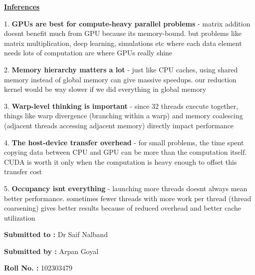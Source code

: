 \documentclass[12pt]{article}
\begin{document}
\vspace{1cm}

\textbf{\Large \underline{Inferences}}

\vspace{1cm}

1. \textbf{GPUs are best for compute-heavy parallel problems} - matrix addition doesnt benefit much from GPU because its memory-bound. but problems like matrix multiplication, deep learning, simulations etc where each data element needs lots of computation are where GPUs really shine

2. \textbf{Memory hierarchy matters a lot} - just like CPU caches, using shared memory instead of global memory can give massive speedups. our reduction kernel would be way slower if we did everything in global memory

3. \textbf{Warp-level thinking is important} - since 32 threads execute together, things like warp divergence (branching within a warp) and memory coalescing (adjacent threads accessing adjacent memory) directly impact performance

4. \textbf{The host-device transfer overhead} - for small problems, the time spent copying data between CPU and GPU can be more than the computation itself. CUDA is worth it only when the computation is heavy enough to offset this transfer cost

5. \textbf{Occupancy isnt everything} - launching more threads doesnt always mean better performance. sometimes fewer threads with more work per thread (thread coarsening) gives better results because of reduced overhead and better cache utilization

\vspace{2cm}

\textbf{Submitted to :} Dr Saif Nalband

\textbf{Submitted by :} Arpan Goyal

\textbf{Roll No. :} 102303479
\end{document}
